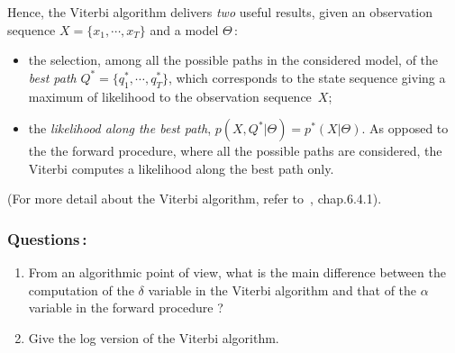 \documentclass[twoside,a4paper,titlepage]{article}
\begin{document}
\pagebreak
Hence, the Viterbi algorithm delivers {\em two} useful results, given an
observation sequence $X=\{x_1,\cdots,x_T\}$ and a model $\Theta$\,:
\begin{itemize}
\item the selection, among all the possible paths in the considered model,
of the {\em best path} $Q^* = \{q^*_1,\cdots,q^*_T\}$, which corresponds to
the state sequence giving a maximum of likelihood to the observation
sequence~$X$;
%
\item the {\em likelihood along the best path}, $p(X,Q^*|\Theta) =
p^*(X|\Theta)$. As opposed to the the forward procedure, where all the
possible paths are considered, the Viterbi computes a likelihood along the
best path only.
\end{itemize}
(For more detail about the Viterbi algorithm, refer to~\cite{RAB93},
chap.6.4.1).


\subsubsection*{Questions\,:}
\begin{enumerate}
\item From an algorithmic point of view, what is the main difference
between the computation of the $\delta$ variable in the Viterbi algorithm
and that of the $\alpha$ variable in the forward procedure ?
\item Give the log version of the Viterbi algorithm.
\end{enumerate}
\end{document}
